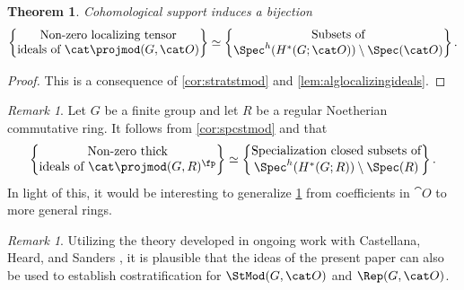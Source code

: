 \documentclass{amsart}%
\numberwithin{equation}{section}%
\newtheorem{Thm}[equation]{Theorem}
\theoremstyle{remark}
\newtheorem{Rem}[equation]{Remark}
\begin{document}
\begin{Thm}\label{thm:stratex}
Cohomological support induces a bijection
\[
\begin{Bmatrix}
\text{Non-zero localizing tensor} \\
\text{ideals of } \cat \projmod(G,\cat O)
\end{Bmatrix} 
\simeq
\begin{Bmatrix}
\text{Subsets of} \\
\Spec^h(H^*(G;\cat O))\setminus\Spec(\cat O)
\end{Bmatrix}.
\]
\end{Thm}
\begin{proof}
This is a consequence of \cref{cor:stratstmod} and \cref{lem:alglocalizingideals}.
\end{proof}

\begin{Rem}\label{rem:tstex}
Let $G$ be a finite group and let $R$ be a regular Noetherian commutative ring. It follows from \cref{cor:spcstmod} and \cite[Thm.~1]{krausestevenson_stablederived} that
\[
\begin{Bmatrix}
\text{Non-zero thick} \\
\text{ideals of } \cat \projmod(G,R)^{\fp}
\end{Bmatrix} 
\simeq
\begin{Bmatrix}
\text{Specialization closed subsets of} \\
\Spec^h(H^*(G;R))\setminus\Spec(R)
\end{Bmatrix}.
\]
In light of this, it would be interesting to generalize \cref{thm:stratex} from coefficients in $\cat O$ to more general rings. 
\end{Rem}

\begin{Rem}\label{rem:costratification}
Utilizing the theory developed in ongoing work with Castellana, Heard, and Sanders \cite{bchs1}, it is plausible that the ideas of the present paper can also be used to establish costratification for $\StMod(G,\cat O)$ and $\Rep(G, \cat O)$.
\end{Rem}


\end{document}
